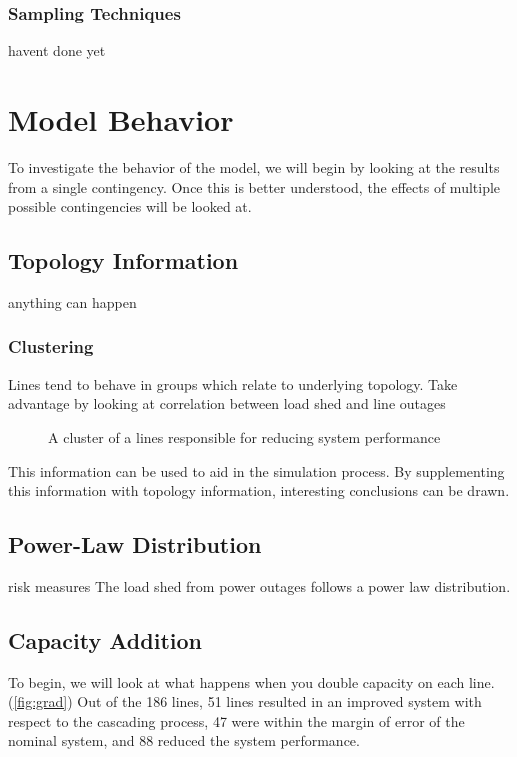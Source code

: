 \subsubsection{Sampling Techniques}
havent done yet


\section{Model Behavior}
To investigate the behavior of the model, we will begin by looking at the results from a single contingency.  Once this is better understood, the effects of multiple possible contingencies will be looked at.
\subsection{Topology Information}
anything can happen
\subsubsection{Clustering}
Lines tend to behave in groups which relate to underlying topology.
Take advantage by looking at correlation between load shed and line outages


\begin{figure}
\begin{center}

\end{center}
\caption{A cluster of a lines responsible for reducing system performance}
\label{fig:cluster}
\end{figure}

This information can be used to aid in the simulation process.  By supplementing this information with topology information, interesting conclusions can be drawn.

\subsection{Power-Law Distribution}
risk measures
The load shed from power outages follows a power law distribution.


\subsection{Capacity Addition}
To begin, we will look at what happens when you double capacity on each line.  (\ref{fig:grad})  Out of the 186 lines, 51 lines resulted in an improved system with respect to the cascading process, 47 were within the margin of error of the nominal system, and 88 reduced the system performance.
\begin{figure}

\end{figure}

